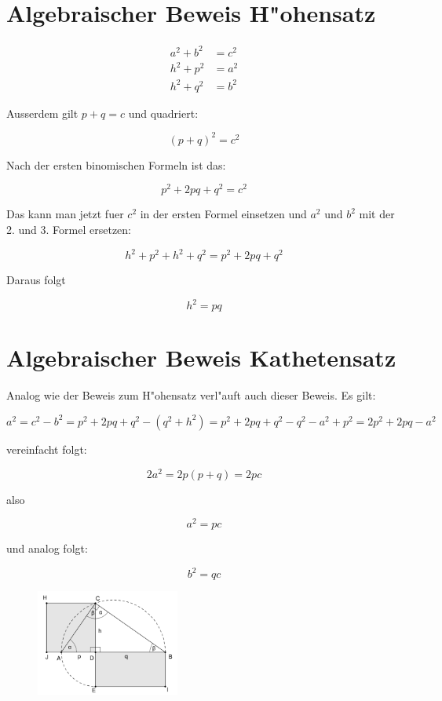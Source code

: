 \documentclass{article}
\begin{document}
\section{Algebraischer Beweis H"ohensatz}

\begin{align*}
a^2 + b^2 &= c^2\\ 
h^2 + p^2 &= a^2\\
h^2 + q^2 &= b^2
\end{align*}

Ausserdem gilt \( p+q = c \) und quadriert:

\[ (p + q)^2 = c^2\]

Nach der ersten binomischen Formeln ist das:

\[ p^2 + 2pq + q^2 = c^2 \]

Das kann man jetzt fuer $c^2$ in der ersten Formel einsetzen und $a^2$ und $b^2$ mit der 2. und 3. Formel ersetzen:

\[ h^2 + p^2 + h^2 + q^2 = p^2 + 2pq + q^2 \]

Daraus folgt

\[ h^2=pq \]

\section{Algebraischer Beweis Kathetensatz}

Analog wie der Beweis zum H"ohensatz verl"auft auch dieser Beweis. Es gilt:

\[ a^2 = c^2-b^2=p^2+2pq+q^2-(q^2+h^2)=p^2+2pq+q^2-q^2-a^2+p^2=2p^2+2pq-a^2 \]

vereinfacht folgt:

\[ 2a^2 = 2p(p + q) = 2pc \]

also 

\[ a^2 = pc \]

und analog folgt:

\[ b^2 = qc \]

\begin{figure}[h]
\centering
\includegraphics[width=0.42\textwidth]{Hoehensatz}
\end{figure}


\newpage
\begin{figure}[t]
\end{figure}
\end{document}

